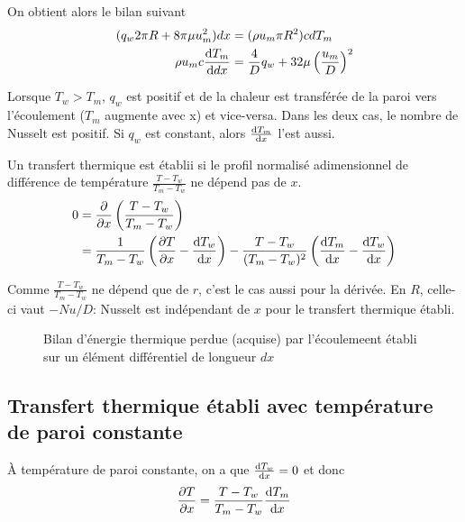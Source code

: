     On obtient alors le bilan suivant
    \begin{equation}
      \begin{aligned}
        (q_w 2\pi R + 8 \pi \mu u_m^2) dx &= (\rho u_m \pi R^2)cdT_m\\
        \rho u_m c \dv{T_m}{dx} &= \frac{4}{D} q_w + 32 \mu \left(\frac{u_m}{D}\right)^2
      \end{aligned}
    \end{equation}

    Lorsque $T_w > T_m$, $q_w$ est positif et de la chaleur est transférée de la paroi vers l'écoulement ($T_m$ augmente avec x) et vice-versa. Dans les deux cas, le nombre de Nusselt est positif. Si $q_w$ est constant, alors $\dv{T_m}{x}$ l'est aussi.

    Un transfert thermique est établii si le profil normalisé adimensionnel de différence de température $\frac{T - T_w}{T_m - T_w}$ ne dépend pas de $x$.
    \begin{equation}
      \begin{aligned}
        0 &= \pdv{x} \left(\frac{T-T_w}{T_m - T_w}\right)\\
        &= \frac{1}{T_m - T_w} \left(\pdv{T}{x} - \dv{T_w}{x}\right) - \frac{T-T_w}{(T_m - T_w)^2} \left(\dv{T_m}{x} - \dv{T_w}{x}\right)
      \end{aligned}
    \end{equation}

    Comme $\frac{T - T_w}{T_m - T_w}$ ne dépend que de $r$, c'est le cas aussi pour la dérivée. En $R$, celle-ci vaut $-Nu/D$: Nusselt est indépendant de $x$ pour le transfert thermique établi.

    \begin{figure}[!h]
      \centering
      
      \caption{Bilan d'énergie thermique perdue (acquise) par l'écoulemeent établi sur un élément différentiel de longueur $dx$}
      \label{bilanEnerg}
    \end{figure}

    \subsection{Transfert thermique établi avec température de paroi constante}
      À température de paroi constante, on a que $\dv{T_w}{x} = 0$ et donc
      \begin{equation}
        \pdv{T}{x} = \frac{T-T_w}{T_m - T_w} \dv{T_m}{x}
      \end{equation}

